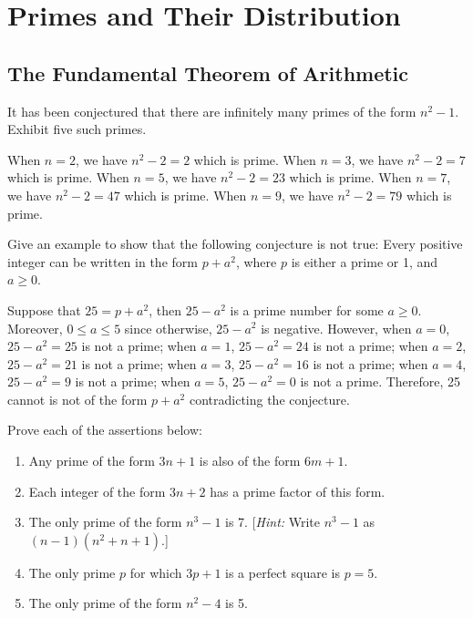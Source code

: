 \chapter{Primes and Their Distribution}

\section{The Fundamental Theorem of Arithmetic}

\begin{exercise}
    It has been conjectured that there are infinitely many primes of the form $n^2 - 1$. Exhibit five such primes. \\
\end{exercise}

\begin{solution}
    When $n = 2$, we have $n^2 - 2 = 2$ which is prime. When $n = 3$, we have $n^2 - 2 = 7$ which is prime. When $n = 5$, we have $n^2 - 2 = 23$ which is prime. When $n = 7$, we have $n^2 - 2 = 47$ which is prime. When $n = 9$, we have $n^2 - 2 = 79$ which is prime.\\
\end{solution}

\begin{exercise}
    Give an example to show that the following conjecture is not true: Every positive integer can be written in the form $p + a^2$, where $p$ is either a prime or 1, and $a \geq 0$. \\
\end{exercise}

\begin{solution}
    Suppose that $25 = p + a^2$, then $25 - a^2$ is a prime number for some $a \geq 0$. Moreover, $0 \leq a \leq 5$ since otherwise, $25 - a^2$ is negative. However, when $a = 0$, $25 - a^2 = 25$ is not a prime; when $a = 1$, $25 - a^2 = 24$ is not a prime; when $a = 2$, $25 - a^2 = 21$ is not a prime; when $a = 3$, $25 - a^2 = 16$ is not a prime; when $a = 4$, $25 - a^2 = 9$ is not a prime; when $a = 5$, $25 - a^2 = 0$ is not a prime. Therefore, 25 cannot is not of the form $p + a^2$ contradicting the conjecture. \\
\end{solution}

\begin{exercise}
    Prove each of the assertions below:
    \begin{enumerate}
        \item Any prime of the form $3n+1$ is also of the form $6m+1$.
        \item Each integer of the form $3n+2$ has a prime factor of this form.
        \item The only prime of the form $n^3 - 1$ is 7. [\textit{Hint:} Write $n^3 - 1$ as $(n-1)(n^2 + n + 1)$.]
        \item The only prime $p$ for which $3p + 1$ is a perfect square is $p = 5$.
        \item The only prime of the form $n^2 - 4$ is 5.
    \end{enumerate}
\end{exercise}

